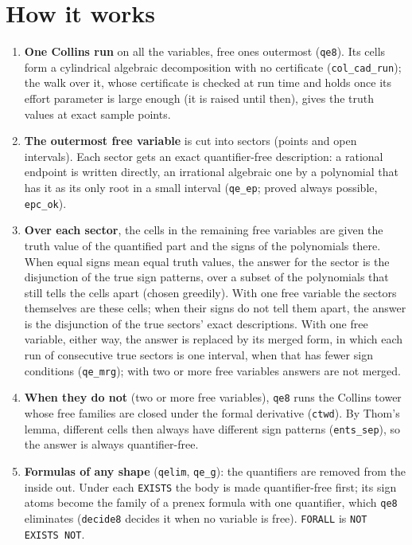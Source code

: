 \documentclass[11pt]{article}
\begin{document}
\section{How it works}
\begin{enumerate}[leftmargin=1.3em, itemsep=3pt]
\item \textbf{One Collins run} on all the variables, free ones outermost (\texttt{qe8}). Its cells form a
cylindrical algebraic decomposition with no certificate (\texttt{col\_cad\_run}); the walk over it, whose
certificate is checked at run time and holds once its effort parameter is large enough (it is raised until then),
gives the truth values at exact sample points.
\item \textbf{The outermost free variable} is cut into sectors (points and open intervals). Each sector gets an
exact quantifier-free description: a rational endpoint is written directly, an irrational algebraic one by a
polynomial that has it as its only root in a small interval (\texttt{qe\_ep}; proved always possible,
\texttt{epc\_ok}).
\item \textbf{Over each sector}, the cells in the remaining free variables are given the truth value of the
quantified part and the signs of the polynomials there. When equal signs mean equal truth values, the answer for
the sector is the disjunction of the true sign patterns, over a subset of the polynomials that still tells the
cells apart (chosen greedily). With one free variable the sectors themselves are these cells; when their signs do
not tell them apart, the answer is the disjunction of the true sectors' exact descriptions. With one free variable,
either way, the answer is replaced by its merged form, in which each run of consecutive true sectors is one interval,
when that has fewer sign conditions (\texttt{qe\_mrg}); with two or more free variables answers are not merged.
\item \textbf{When they do not} (two or more free variables), \texttt{qe8} runs the Collins tower whose free
families are closed under the formal derivative (\texttt{ctwd}). By Thom's lemma, different cells then always have
different sign patterns (\texttt{ents\_sep}), so the answer is always quantifier-free.
\item \textbf{Formulas of any shape} (\texttt{qelim}, \texttt{qe\_g}): the quantifiers are removed from the inside
out. Under each \texttt{EXISTS} the body is made quantifier-free first; its sign atoms become the family of a
prenex formula with one quantifier, which \texttt{qe8} eliminates (\texttt{decide8} decides it when no variable is
free). \texttt{FORALL} is \texttt{NOT EXISTS NOT}.
\end{enumerate}
\end{document}
